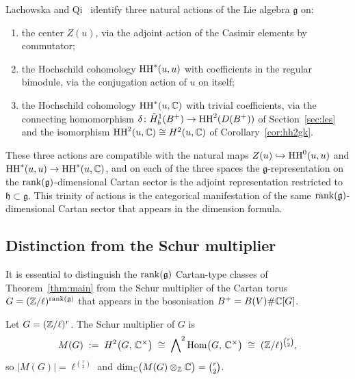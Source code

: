\begin{remark}
\label{rem:threeact}
Lachowska and Qi~\cite{LQ21} identify three natural actions of the Lie algebra $\mathfrak{g}$ on:
\begin{enumerate}[label=(\roman*)]
\item the center $Z(u)$, via the adjoint action of the Casimir elements by commutator;
\item the Hochschild cohomology $\operatorname{HH}^*(u, u)$ with coefficients in the regular bimodule, via the conjugation action of $u$ on itself;
\item the Hochschild cohomology $\operatorname{HH}^*(u, \mathbb{C})$ with trivial coefficients, via the connecting homomorphism $\delta \colon \tilde{H}^1_b(B^{+}) \to \operatorname{HH}^2(D(B^{+}))$ of Section~\ref{sec:les} and the isomorphism $\operatorname{HH}^2(u, \mathbb{C}) \cong H^2(u, \mathbb{C})$ of Corollary~\ref{cor:hh2gk}.
\end{enumerate}
These three actions are compatible with the natural maps $Z(u) \hookrightarrow \operatorname{HH}^0(u, u)$ and $\operatorname{HH}^*(u, u) \to \operatorname{HH}^*(u, \mathbb{C})$, and on each of the three spaces the $\mathfrak{g}$-representation on the $\operatorname{rank}(\mathfrak{g})$-dimensional Cartan sector is the adjoint representation restricted to $\mathfrak{h} \subset \mathfrak{g}$. This trinity of actions is the categorical manifestation of the same $\operatorname{rank}(\mathfrak{g})$-dimensional Cartan sector that appears in the dimension formula.
\end{remark}

\subsection{Distinction from the Schur multiplier}
\label{sec:cat_schur}

It is essential to distinguish the $\operatorname{rank}(\mathfrak{g})$ Cartan-type classes of Theorem~\ref{thm:main} from the Schur multiplier of the Cartan torus $G = (\mathbb{Z}/\ell)^{\operatorname{rank}(\mathfrak{g})}$ that appears in the bosonisation $B^{+} = B(V) \# \mathbb{C}[G]$.

\begin{proposition}
\label{prop:schur}
Let $G = (\mathbb{Z}/\ell)^r$. The Schur multiplier of $G$ is
\[
M(G) \;:=\; H^2\bigl(G,\, \mathbb{C}^\times\bigr) \;\cong\; \bigwedge\nolimits^2 \operatorname{Hom}\bigl(G,\, \mathbb{C}^\times\bigr) \;\cong\; (\mathbb{Z}/\ell)^{\binom{r}{2}},
\]
so $|M(G)| = \ell^{\binom{r}{2}}$ and $\dim_{\mathbb{C}}\bigl(M(G) \otimes_{\mathbb{Z}} \mathbb{C}\bigr) = \binom{r}{2}$.
\end{proposition}

